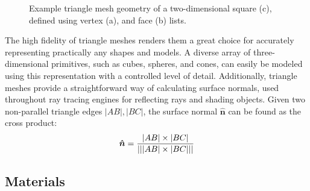\begin{figure}[!ht]
\begin{subfigure}{.35\textwidth}
        \caption{}
    \end{subfigure}

    \caption[Example triangle mesh geometry of a two-dimensional square]{
        Example triangle mesh geometry of a two-dimensional square (c), defined using vertex (a), and face (b) lists.}
    \label{fig:Implementation/SceneRepresentation/mesh}
\end{figure}

The high fidelity of triangle meshes renders them a great choice for accurately representing practically any shapes and models.
A diverse array of three-dimensional primitives, such as cubes, spheres, and cones, can easily be modeled using this representation with a controlled level of detail. 
Additionally, triangle meshes provide a straightforward way of calculating surface normals, used throughout ray tracing engines for reflecting rays and shading objects.
Given two non-parallel triangle edges $ |AB|, |BC| $, the surface normal $ \bm{\hat{n}} $ can be found as the cross product:
%
\begin{equation}
    \bm{\hat{n}} = \frac{|AB|\times|BC|}{\lvert\lvert |AB|\times|BC| \rvert\rvert}
\end{equation}

\subsection{Materials}

